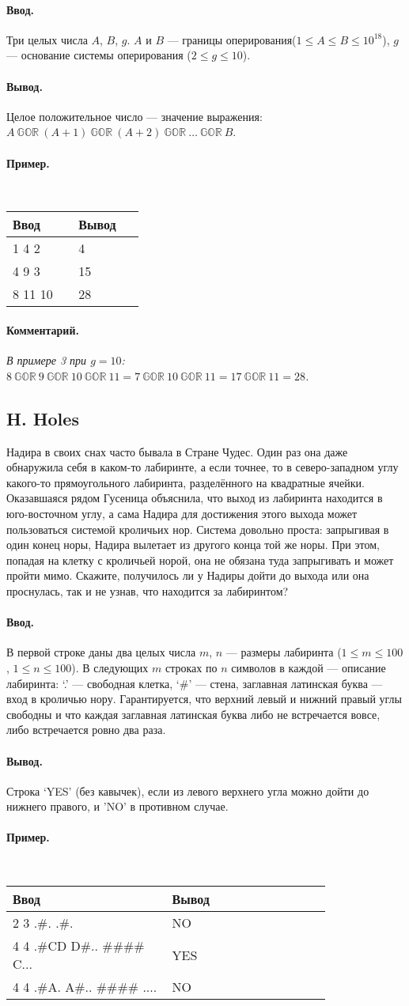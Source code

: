 \documentclass[12pt, a4paper]{article}
\newcommand{\informat}[1]
{
	\paragraph{Ввод.\\} #1
}
\newcommand{\outformat}[1]
{
	\paragraph{Вывод.\\} #1
}
\newcommand{\exampleee}[6]
{
	\paragraph{Пример.\\}
	{\tt
	\begin{tabular}{|p{0.4\linewidth}|p{0.4\linewidth}|}
	\hline
	Ввод 	& Вывод  	\\
	\hline
	#1 		& #2 		\\
	\hline
	#3		& #4		\\
	\hline
	#5		& #6		\\
	\hline
	\end{tabular}
	}
}
\newcommand{\excomm}[1]
{
	\paragraph{Комментарий. \\}
	\textit{#1}
}
\begin{document}
\informat{Три целых числа $A$, $B$, $g$. $A$ и $B$ --- границы оперирования($1 \le A \le B \le 10^{18}$), $g$ --- основание системы оперирования ($2 \le g \le 10$).}

\outformat{Целое положительное число --- значение выражения: \newline $A \ \mathbb{GOR} \ (A+1) \ \mathbb{GOR} \ (A+2) \ \mathbb{GOR} \ \dots \ \mathbb{GOR} \ B$.}

\exampleee{1 4 2}{4}{4 9 3}{15}{8 11 10}{28}

\excomm{В примере 3 при $g = 10$: \newline
$8 \ \mathbb{GOR} \ 9 \ \mathbb{GOR} \ 10 \ \mathbb{GOR} \ 11 = 7 \ \mathbb{GOR} \ 10 \ \mathbb{GOR} \ 11 = 17 \ \mathbb{GOR} \ 11 = 28$.}



\subsection*{H. Holes}

Надира в своих снах часто бывала в Стране Чудес. Один раз она даже обнаружила себя в каком-то лабиринте, а если точнее, то в северо-западном углу какого-то прямоугольного лабиринта, разделённого на квадратные ячейки. Оказавшаяся рядом Гусеница объяснила, что выход из лабиринта находится в юго-восточном углу, а сама Надира для достижения этого выхода может пользоваться системой кроличьих нор. Система довольно проста: запрыгивая в один конец норы, Надира вылетает из другого конца той же норы. При этом, попадая на клетку с кроличьей норой, она не обязана туда запрыгивать и может пройти мимо. Скажите, получилось ли у Надиры дойти до выхода или она проснулась, так и не узнав, что находится за лабиринтом?

\informat{В первой строке даны два целых числа $m$, $n$ --- размеры лабиринта ($1 \le m \le 100$, $1 \le n \le 100$). В следующих $m$ строках по $n$ символов в каждой --- описание лабиринта: ‘.’ --- свободная клетка, ‘\#’ --- стена, заглавная латинская буква --- вход в кроличью нору. Гарантируется, что верхний левый и нижний правый углы свободны и что каждая заглавная латинская буква либо не встречается вовсе, либо встречается ровно два раза.}

\outformat{Строка ‘YES’ (без кавычек), если из левого верхнего угла можно дойти до нижнего правого, и ’NO’ в противном случае.}

\exampleee%
{2 3 \newline
.\#.\newline
.\#.}%
{NO}%
{4 4 \newline
.\#CD \newline
D\#.. \newline
\#\#\#\# \newline
C...}%
{YES}%
{4 4%
.\#A. \newline
A\#.. \newline
\#\#\#\# \newline
....}%
{NO}
\end{document}
